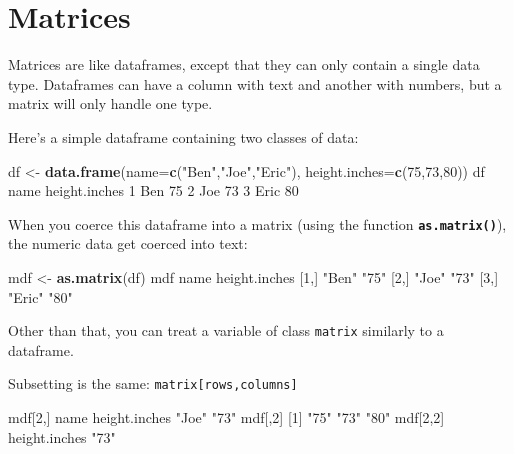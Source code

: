 \documentclass[
]{book}
\newenvironment{Shaded}{\begin{snugshade}}{\end{snugshade}}
\newcommand{\DataTypeTok}[1]{\textcolor[rgb]{0.13,0.29,0.53}{#1}}
\newcommand{\DecValTok}[1]{\textcolor[rgb]{0.00,0.00,0.81}{#1}}
\newcommand{\KeywordTok}[1]{\textcolor[rgb]{0.13,0.29,0.53}{\textbf{#1}}}
\newcommand{\NormalTok}[1]{#1}
\newcommand{\StringTok}[1]{\textcolor[rgb]{0.31,0.60,0.02}{#1}}
\begin{document}
\hypertarget{matrices}{%
\section*{Matrices}\label{matrices}}

Matrices are like dataframes, except that they can only contain a single data type. Dataframes can have a column with text and another with numbers, but a matrix will only handle one type.

Here's a simple dataframe containing two classes of data:

\begin{Shaded}
\begin{Highlighting}[]
\NormalTok{df <-}\StringTok{ }\KeywordTok{data.frame}\NormalTok{(}\DataTypeTok{name=}\KeywordTok{c}\NormalTok{(}\StringTok{"Ben"}\NormalTok{,}\StringTok{"Joe"}\NormalTok{,}\StringTok{"Eric"}\NormalTok{),}
                 \DataTypeTok{height.inches=}\KeywordTok{c}\NormalTok{(}\DecValTok{75}\NormalTok{,}\DecValTok{73}\NormalTok{,}\DecValTok{80}\NormalTok{))}
\NormalTok{df}
\NormalTok{  name height.inches}
\DecValTok{1}\NormalTok{  Ben            }\DecValTok{75}
\DecValTok{2}\NormalTok{  Joe            }\DecValTok{73}
\DecValTok{3}\NormalTok{ Eric            }\DecValTok{80}
\end{Highlighting}
\end{Shaded}

When you coerce this dataframe into a matrix (using the function \textbf{\texttt{as.matrix()}}), the numeric data get coerced into text:

\begin{Shaded}
\begin{Highlighting}[]
\NormalTok{mdf <-}\StringTok{ }\KeywordTok{as.matrix}\NormalTok{(df)}
\NormalTok{mdf}
\NormalTok{     name   height.inches}
\NormalTok{[}\DecValTok{1}\NormalTok{,] }\StringTok{"Ben"}  \StringTok{"75"}         
\NormalTok{[}\DecValTok{2}\NormalTok{,] }\StringTok{"Joe"}  \StringTok{"73"}         
\NormalTok{[}\DecValTok{3}\NormalTok{,] }\StringTok{"Eric"} \StringTok{"80"}         
\end{Highlighting}
\end{Shaded}

Other than that, you can treat a variable of class \texttt{matrix} similarly to a dataframe.

Subsetting is the same: \texttt{matrix{[}rows,columns{]}}

\begin{Shaded}
\begin{Highlighting}[]
\NormalTok{mdf[}\DecValTok{2}\NormalTok{,]}
\NormalTok{         name height.inches }
        \StringTok{"Joe"}          \StringTok{"73"} 
\NormalTok{mdf[,}\DecValTok{2}\NormalTok{]}
\NormalTok{[}\DecValTok{1}\NormalTok{] }\StringTok{"75"} \StringTok{"73"} \StringTok{"80"}
\NormalTok{mdf[}\DecValTok{2}\NormalTok{,}\DecValTok{2}\NormalTok{]}
\NormalTok{height.inches }
         \StringTok{"73"} 
\end{Highlighting}
\end{Shaded}
\end{document}
